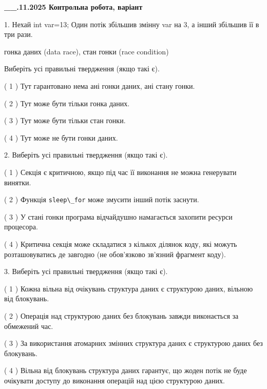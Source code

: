 \documentclass[12pt, ukrainian]{article}
\def\code#1{\Verb!#1!}
\begin{document}
\newpage
\begin {large}

\textbf{\_\_.11.2025 Контрольна робота, варіант  }\par


{
1. Нехай int var=13; Один потік збільшив змінну var на 3, а інший збільшив її в три рази.

гонка даних (data race), стан гонки (race condition)

Виберіть усі правильні твердження (якщо такі є).\par
\vspace{2mm}
( 1 ) Тут гарантовано нема ані гонки даних, ані стану гонки.%

( 2 ) Тут може бути тільки гонка даних.%

( 3 ) Тут може бути тільки стан гонки.%

( 4 ) Тут може не бути гонки даних.%


2. Виберіть усі правильні твердження (якщо такі є).\par
\vspace{2mm}

( 1 ) Секція є критичною, якщо під час її виконання не можна генерувати винятки.%

( 2 ) Функція \code{sleep\_for} може змусити інший потік заснути.%

( 3 ) У стані гонки програма відчайдушно намагається захопити ресурси процесора.%

( 4 ) Критична секція може складатися з кількох ділянок коду, які можуть розташовуватись де завгодно (не обов’язково зв’язний фрагмент коду).%


3. Виберіть усі правильні твердження (якщо такі є).\par
\vspace{2mm}

( 1 ) Кожна вільна від очікувань структура даних є структурою даних, вільною від блокувань.%

( 2 ) Операція над структурою даних без блокувань завжди виконається за обмежений час.%

( 3 ) За використання атомарних змінних структура даних є структурою даних без блокувань.%

( 4 ) Вільна від блокувань структура даних гарантує, що жоден потік не буде очікувати доступу до виконання операцій над цією структурою даних.%


}
\end{large}
\end{document}
